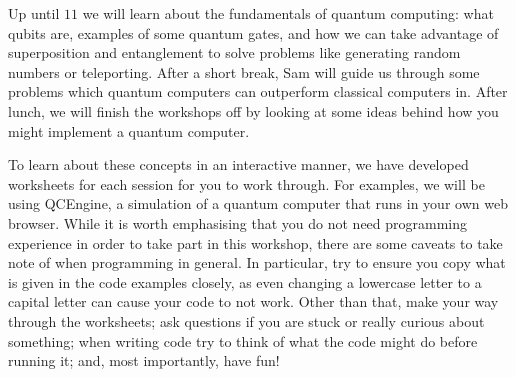 \documentclass{article}
\begin{document}
Up until $11$ we will learn about the fundamentals of quantum computing: what qubits are, examples of some quantum gates, and how we can take advantage of superposition and entanglement to solve problems like generating random numbers or teleporting. After a short break, Sam will guide us through some problems which quantum computers can outperform classical computers in. After lunch, we will finish the workshops off by looking at some ideas behind how you might implement a quantum computer.

To learn about these concepts in an interactive manner, we have developed worksheets for each session for you to work through. For examples, we will be using QCEngine, a simulation of a quantum computer that runs in your own web browser. While it is worth emphasising that you do not need programming experience in order to take part in this workshop, there are some caveats to take note of when programming in general. In particular, try to ensure you copy what is given in the code examples closely, as even changing a lowercase letter to a capital letter can cause your code to not work. Other than that, make your way through the worksheets; ask questions if you are stuck or really curious about something; when writing code try to think of what the code might do before running it; and, most importantly, have fun!
\end{document}
